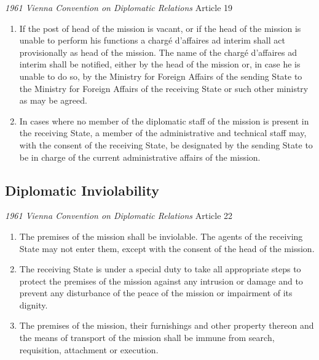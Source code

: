 \begin{conventiondetails}{\textit{1961 Vienna Convention on Diplomatic Relations} Article 19}
    \flushleft
    \begin{enumerate}
        \item  If the post of head of the mission is vacant, or if the head of the mission is unable to perform his functions a chargé d'affaires ad interim shall act provisionally as head of the mission. The name of the chargé d'affaires ad interim shall be notified, either by the head of the mission or, in case he is unable to do so, by the Ministry for Foreign Affairs of the sending State to the Ministry for Foreign Affairs of the receiving State or such other ministry as may be agreed.
        \item In cases where no member of the diplomatic staff of the mission is present in the receiving State, a member of the administrative and technical staff may, with the consent of the receiving State, be designated by the sending State to be in charge of the current administrative affairs of the mission.
    \end{enumerate}
\end{conventiondetails}

\subsection{Diplomatic Inviolability}
\begin{conventiondetails}{\textit{1961 Vienna Convention on Diplomatic Relations} Article 22}
    \flushleft
    \begin{enumerate}
        \item The premises of the mission shall be inviolable. The agents of the receiving State may not enter them, except with the consent of the head of the mission.
        \item The receiving State is under a special duty to take all appropriate steps to protect the premises of the mission against any intrusion or damage and to prevent any disturbance of the peace of the mission or impairment of its dignity.
        \item The premises of the mission, their furnishings and other property thereon and the means of transport of the mission shall be immune from search, requisition, attachment or execution.
    \end{enumerate}
\end{conventiondetails}

